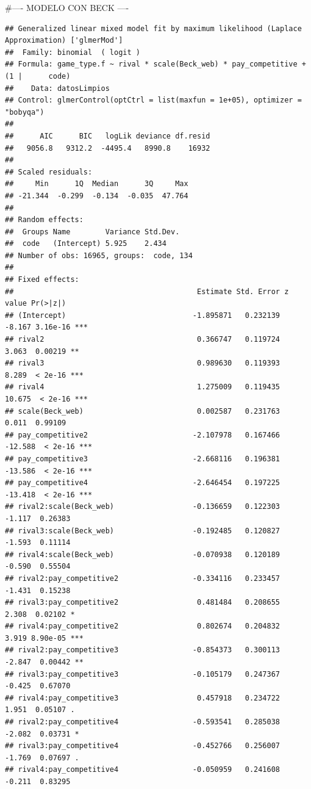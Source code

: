 \documentclass[
]{article}
\begin{document}
\#---- MODELO CON BECK ----

\begin{verbatim}
## Generalized linear mixed model fit by maximum likelihood (Laplace Approximation) ['glmerMod']
##  Family: binomial  ( logit )
## Formula: game_type.f ~ rival * scale(Beck_web) * pay_competitive + (1 |      code)
##    Data: datosLimpios
## Control: glmerControl(optCtrl = list(maxfun = 1e+05), optimizer = "bobyqa")
## 
##      AIC      BIC   logLik deviance df.resid 
##   9056.8   9312.2  -4495.4   8990.8    16932 
## 
## Scaled residuals: 
##     Min      1Q  Median      3Q     Max 
## -21.344  -0.299  -0.134  -0.035  47.764 
## 
## Random effects:
##  Groups Name        Variance Std.Dev.
##  code   (Intercept) 5.925    2.434   
## Number of obs: 16965, groups:  code, 134
## 
## Fixed effects:
##                                          Estimate Std. Error z value Pr(>|z|)    
## (Intercept)                             -1.895871   0.232139  -8.167 3.16e-16 ***
## rival2                                   0.366747   0.119724   3.063  0.00219 ** 
## rival3                                   0.989630   0.119393   8.289  < 2e-16 ***
## rival4                                   1.275009   0.119435  10.675  < 2e-16 ***
## scale(Beck_web)                          0.002587   0.231763   0.011  0.99109    
## pay_competitive2                        -2.107978   0.167466 -12.588  < 2e-16 ***
## pay_competitive3                        -2.668116   0.196381 -13.586  < 2e-16 ***
## pay_competitive4                        -2.646454   0.197225 -13.418  < 2e-16 ***
## rival2:scale(Beck_web)                  -0.136659   0.122303  -1.117  0.26383    
## rival3:scale(Beck_web)                  -0.192485   0.120827  -1.593  0.11114    
## rival4:scale(Beck_web)                  -0.070938   0.120189  -0.590  0.55504    
## rival2:pay_competitive2                 -0.334116   0.233457  -1.431  0.15238    
## rival3:pay_competitive2                  0.481484   0.208655   2.308  0.02102 *  
## rival4:pay_competitive2                  0.802674   0.204832   3.919 8.90e-05 ***
## rival2:pay_competitive3                 -0.854373   0.300113  -2.847  0.00442 ** 
## rival3:pay_competitive3                 -0.105179   0.247367  -0.425  0.67070    
## rival4:pay_competitive3                  0.457918   0.234722   1.951  0.05107 .  
## rival2:pay_competitive4                 -0.593541   0.285038  -2.082  0.03731 *  
## rival3:pay_competitive4                 -0.452766   0.256007  -1.769  0.07697 .  
## rival4:pay_competitive4                 -0.050959   0.241608  -0.211  0.83295    

\end{verbatim}
\end{document}
